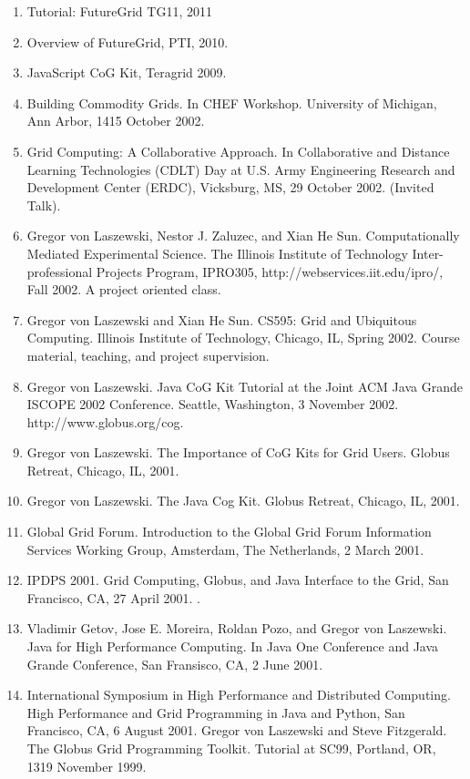 \documentclass{article}
\renewcommand{\url}[1]{\href{#1}{\faExternalLink}}
\begin{document}
\begin{enumerate}
\item  Tutorial: FutureGrid TG11, 2011
\item  Overview of FutureGrid, PTI, 2010.
\item  JavaScript CoG Kit, Teragrid 2009. 
\item  Building Commodity Grids. In CHEF Workshop. University of Michigan, Ann Arbor, 1415 October 2002. 
\item  Grid Computing: A Collaborative Approach. In Collaborative and Distance Learning Technologies (CDLT) Day at U.S. Army Engineering Research and Development Center (ERDC), Vicksburg, MS, 29 October 2002. (Invited Talk). 
\item  Gregor von Laszewski, Nestor J. Zaluzec, and Xian He Sun. Computationally Mediated Experimental Science. The Illinois Institute of Technology Inter-professional Projects Program, IPRO305, http://webservices.iit.edu/ipro/, Fall 2002. A project oriented class. 
\item  Gregor von Laszewski and Xian He Sun. CS595: Grid and Ubiquitous Computing. Illinois Institute of Technology, Chicago, IL, Spring 2002. Course material, teaching, and project supervision. 
\item  Gregor von Laszewski. Java CoG Kit Tutorial at the Joint ACM Java Grande ISCOPE 2002 Conference. Seattle, Washington, 3 November 2002. http://www.globus.org/cog. 
\item  Gregor von Laszewski. The Importance of CoG Kits for Grid Users. Globus Retreat, Chicago, IL, 2001. 
\item  Gregor von Laszewski. The Java Cog Kit. Globus Retreat, Chicago, IL, 2001. 
\item  Global Grid Forum. Introduction to the Global Grid Forum Information Services Working Group, Amsterdam, The Netherlands, 2 March 2001. 
\item  IPDPS 2001. Grid Computing, Globus, and Java Interface to the Grid, San Francisco, CA, 27 April 2001. \url{http://www.ipdps.org/ipdps2001/2001_tutorial4.html}.
\item  Vladimir Getov, Jose E. Moreira, Roldan Pozo, and Gregor von Laszewski. Java for High Performance Computing. In Java One Conference and Java Grande Conference, San Fransisco, CA, 2 June 2001. 
\item  International Symposium in High Performance and Distributed Computing. High Performance and Grid Programming in Java and Python, San Francisco, CA, 6 August 2001. Gregor von Laszewski and Steve Fitzgerald. The Globus Grid Programming Toolkit. Tutorial at SC99, Portland, OR, 1319 November 1999. 

\end{enumerate}
\end{document}

